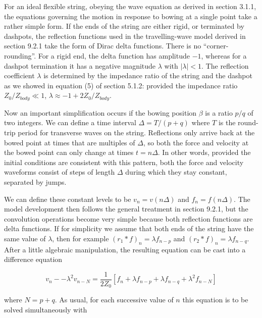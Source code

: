   For an ideal flexible string, obeying the wave equation as derived in section 
  3.1.1, the equations governing the motion in response to bowing at a single 
  point take a rather simple form. If the ends of the string are either rigid, 
  or terminated by dashpots, the reflection functions used in the 
  travelling-wave model derived in section 9.2.1 take the form of Dirac delta 
  functions. There is no ``corner-rounding''. For a rigid end, the delta 
  function has amplitude $-1$, whereas for a dashpot termination it has a 
  negative magnitude $\lambda$ with $|\lambda| < 1$. The reflection coefficient 
  $\lambda$ is determined by the impedance ratio of the string and the dashpot 
  as we showed in equation (5) of section 5.1.2: provided the impedance ratio 
  $Z_{0}/Z_{body} \ll 1$, $\lambda \approx -1 + 2Z_{0}/Z_{body}$. 

  Now an important simplification occurs if the bowing position $\beta$ is a 
  ratio $p/q$ of two integers. We can define a time interval $\Delta=T/(p+q)$ 
  where $T$ is the round-trip period for transverse waves on the string. 
  Reflections only arrive back at the bowed point at times that are multiples 
  of $\Delta$, so both the force and velocity at the bowed point can only 
  change at times $t=n\Delta$. In other words, provided the initial conditions 
  are consistent with this pattern, both the force and velocity waveforms 
  consist of steps of length $\Delta$ during which they stay constant, 
  separated by jumps. 

  We can define these constant levels to be $v_n=v(n \Delta)$ and $f_n=f(n 
  \Delta)$. The model development then follows the general treatment in section 
  9.2.1, but the convolution operations become very simple because both 
  reflection functions are delta functions. If for simplicity we assume that 
  both ends of the string have the same value of $\lambda$, then for example 
  $(r_1 * f)_n = \lambda f_{n-p}$ and $(r_2 * f)_n = \lambda f_{n-q}$. After a 
  little algebraic manipulation, the resulting equation can be cast into a 
  difference equation 

  \begin{equation*}v_n -- \lambda^2 v_{n-N} = \dfrac{1}{2Z_0} \left[f_n + 
  \lambda f_{n-p} + \lambda f_{n-q} + \lambda^2 f_{n-N} \right] 
  \tag{1}\end{equation*} 

  \noindent{}where $N=p+q$. As usual, for each successive value of $n$ this 
  equation is to be solved simultaneously with 

